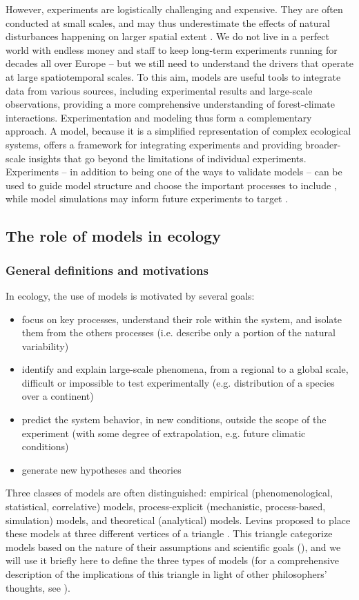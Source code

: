 However, experiments are logistically challenging and expensive. They are often conducted at small scales, and may thus underestimate the effects of natural disturbances happening on larger spatial extent \citep{KroeelDulay2022}. We do not live in a perfect world with endless money and staff to keep long-term experiments running for decades all over Europe -- but we still need to understand the drivers that operate at large spatiotemporal scales. To this aim, models are useful tools to integrate data from various sources, including experimental results and large-scale observations, providing a more comprehensive understanding of forest-climate interactions. Experimentation and modeling thus form a complementary approach. A model, because it is a simplified representation of complex ecological systems, offers a framework for integrating experiments and providing broader-scale insights that go beyond the limitations of individual experiments. Experiments -- in addition to being one of the ways to validate models -- can be used to guide model structure and choose the important processes to include \citep{Cusack2023}, while model simulations may inform future experiments to target \citep{Kannenberg2020}. 

\subsection{The role of models in ecology}

\subsubsection{General definitions and motivations} \label{sec:model}

In ecology, the use of models is motivated by several goals:
\begin{itemize}
\item focus on key processes, understand their role within the system, and isolate them from the others processes (i.e. describe only a portion of the natural variability)
\item identify and explain large-scale phenomena, from a regional to a global scale, difficult or impossible to test experimentally (e.g. distribution of a species over a continent)
\item predict the system behavior, in new conditions, outside the scope of the experiment (with some degree of extrapolation, e.g. future climatic conditions)
\item generate new hypotheses and theories \citep{Morin2022}
\end{itemize}
Three classes of models are often distinguished: empirical (phenomenological, statistical, correlative) models, process-explicit (mechanistic, process-based, simulation) models, and theoretical (analytical) models. Levins proposed to place these models at three different vertices of a triangle \citep{Levins1966, Guisan2000}. This triangle categorize models based on the nature of their assumptions and scientific goals (), and we will use it briefly here to define the three types of models (for a comprehensive description of the implications of this triangle in light of other philosophers' thoughts, see \citealp{Davi2012}). 

